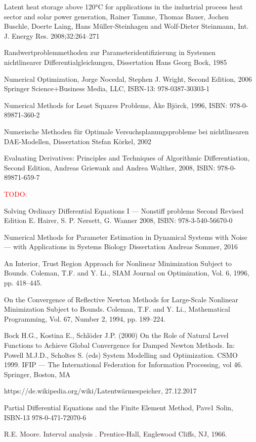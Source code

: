 \documentclass{scrartcl}[12pt, halfparskip]
\numberwithin{equation}{section}
\numberwithin{figure}{section}
\numberwithin{table}{section}
\newcommand{\todo}[1]{\textcolor{red}{TODO: #1}}
\begin{document}
\begin{thebibliography}{9}
	Latent heat storage above 120°C for applications in the industrial process heat sector and solar power generation,
	Rainer Tamme, Thomas Bauer, Jochen Buschle, Doerte Laing, Hans Müller-Steinhagen and Wolf-Dieter Steinmann,
	Int. J. Energy Res. 2008;32:264–271
	
	Randwertproblemmethoden zur Parameteridentifizierung in Systemen nichtlinearer Differentialgleichungen,
	Dissertation Hans Georg Bock, 1985
	
	Numerical Optimization,
	Jorge Nocedal, Stephen J. Wright,
	Second Edition, 2006 Springer Science+Business Media, LLC, ISBN-13: 978-0387-30303-1
	
	Numerical Methods for Least Squares Problems,
	Åke Björck, 1996,
	ISBN: 978-0-89871-360-2
	
	Numerische Methoden
	für Optimale Versuchsplanungsprobleme
	bei nichtlinearen DAE-Modellen,
	Dissertation Stefan Körkel, 2002
	
	Evaluating Derivatives: Principles and Techniques of Algorithmic Differentiation, Second Edition,
	Andreas Griewank and Andrea Walther, 2008,
	ISBN: 978-0-89871-659-7
	
	\todo{}


	Solving Ordinary Differential Equations I --- Nonstiff problems
	Second Revised Edition
	E. Hairer, S. P. Nørsett, G. Wanner 
	2008, ISBN: 978-3-540-56670-0
	
	Numerical Methods for Parameter Estimation
	in Dynamical Systems with Noise --- with Applications in Systems Biology
	Dissertation Andreas Sommer, 2016
	
	An Interior, Trust Region Approach for Nonlinear Minimization Subject to Bounds.
	Coleman, T.F. and Y. Li., 
	SIAM Journal on Optimization, Vol. 6, 1996, pp. 418–445.
  
	On the Convergence of Reflective Newton Methods for Large-Scale Nonlinear Minimization Subject to Bounds.
	Coleman, T.F. and Y. Li., 
	Mathematical Programming, Vol. 67, Number 2, 1994, pp. 189–224.
	
	Bock H.G., Kostina E., Schlöder J.P. (2000) On the Role of Natural Level Functions to Achieve Global Convergence for Damped Newton Methods. In: Powell M.J.D., Scholtes S. (eds) System Modelling and Optimization. CSMO 1999. IFIP — The International Federation for Information Processing, vol 46. Springer, Boston, MA
	
	https://de.wikipedia.org/wiki/Latentwärmespeicher, 27.12.2017
	
	Partial Differential Equations and the Finite Element Method,
	Pave1 Solin, 
	ISBN-13 978-0-471-72070-6
	
	R.E. Moore. Interval analysis . Prentice-Hall, Englewood Cliffs, NJ, 1966.
  
\end{thebibliography}
\end{document}

